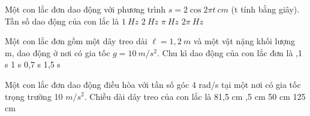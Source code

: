 \begin{vidu} %
 Một con lắc đơn dao động với phương trình $s = 2\cos2\pi t\ cm$ (t tính bằng giây). Tần số dao động của con lắc là
\choice
{\True $1\ Hz$}
{$2\ Hz$}
{$\pi\  Hz$}
{$2\pi\  Hz$}
\end{vidu} %
\begin{vidu} %
Một con lắc đơn gồm một dây treo dài $\ell=1,2\ m$ và một vật nặng khối lượng m, dao động ở nơi có gia tốc $g=10\ m/s^2$. Chu kì dao động của con lắc đơn là
\choice
{,1 s}
{1 s}
{0,7 s}
{1,5 s}
\end{vidu} %

\begin{vidu}%
Một con lắc đơn dao động điều hòa với tần số góc 4 rad/s tại một nơi có gia tốc trọng trường 10 $m/s^2$. Chiều dài dây treo của con lắc là
\choice
{81,5 cm}
{,5 cm}
{50 cm}
{125 cm}
\end{vidu} %

